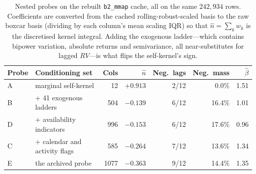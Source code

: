 \begin{table}[H]
\centering
\caption{Nested probes on the rebuilt \texttt{b2\_mmap} cache, all on the same
$242{,}934$ rows. Coefficients are converted from the cached rolling-robust-scaled
basis to the raw boxcar basis (dividing by each column's mean scaling IQR) so that
$\hat n = \sum_k w_k$ is the discretised kernel integral. Adding the exogenous
ladder---which contains bipower variation, absolute returns and semivariance,
all near-substitutes for lagged $RV$---is what flips the self-kernel's sign.}
\label{tab:nested_probes}
\begin{tabular}{llrrrrr}
\toprule
Probe & Conditioning set & Cols & $\hat n$ & Neg.\ lags & Neg.\ mass & $\hat\beta$ \\
\midrule
A & marginal self-kernel & 12 & $+0.913$ & 2/12 & 0.0\% & 1.51 \\
B & + 41 exogenous ladders & 504 & $-0.139$ & 6/12 & 16.4\% & 1.01 \\
D & + availability indicators & 996 & $-0.153$ & 6/12 & 17.6\% & 0.96 \\
C & + calendar and activity flags & 585 & $-0.264$ & 7/12 & 13.6\% & 1.34 \\
E & the archived probe & 1077 & $-0.363$ & 9/12 & 14.4\% & 1.35 \\
\bottomrule
\end{tabular}
\end{table}
